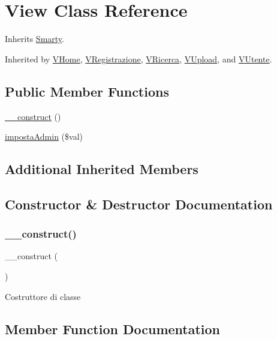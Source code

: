 \hypertarget{class_view}{}\section{View Class Reference}
\label{class_view}


Inherits \mbox{\hyperlink{class_smarty}{Smarty}}.



Inherited by \mbox{\hyperlink{class_v_home}{V\+Home}}, \mbox{\hyperlink{class_v_registrazione}{V\+Registrazione}}, \mbox{\hyperlink{class_v_ricerca}{V\+Ricerca}}, \mbox{\hyperlink{class_v_upload}{V\+Upload}}, and \mbox{\hyperlink{class_v_utente}{V\+Utente}}.

\subsection*{Public Member Functions}
\begin{DoxyCompactItemize}
\item 
\mbox{\hyperlink{class_view_a095c5d389db211932136b53f25f39685}{\+\_\+\+\_\+construct}} ()
\item 
\mbox{\hyperlink{class_view_ac69bb26fe7fab662b91899dfbe411612}{imposta\+Admin}} (\$val)
\end{DoxyCompactItemize}
\subsection*{Additional Inherited Members}


\subsection{Constructor \& Destructor Documentation}
\mbox{\label{class_view_a095c5d389db211932136b53f25f39685}} 
\subsubsection{\texorpdfstring{\+\_\+\+\_\+construct()}{\_\_construct()}}
{\footnotesize\ttfamily \+\_\+\+\_\+construct (\begin{DoxyParamCaption}{ }\end{DoxyParamCaption})}

Costruttore di classe 

\subsection{Member Function Documentation}
\mbox{\label{class_view_ac69bb26fe7fab662b91899dfbe411612}} 
